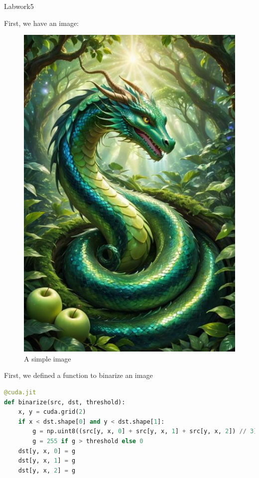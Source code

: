 \documentclass[12pt]{article}
\begin{document}
\begin{center}
    \vspace*{1.8cm}
    \Large
    Labwork5\\
\end{center}

\noindent
First, we have an image:
\begin{figure}[H]
\centering
    \includegraphics[height = 0.5\textheight, keepaspectratio]{images/image.jpeg}
    \caption{A simple image}
\end{figure}


\noindent
First, we defined a function to binarize an image

\begin{lstlisting}[language=Python]
@cuda.jit
def binarize(src, dst, threshold):
    x, y = cuda.grid(2)
    if x < dst.shape[0] and y < dst.shape[1]:
        g = np.uint8((src[y, x, 0] + src[y, x, 1] + src[y, x, 2]) // 3)
        g = 255 if g > threshold else 0
    dst[y, x, 0] = g
    dst[y, x, 1] = g
    dst[y, x, 2] = g
\end{lstlisting}
\end{document}
